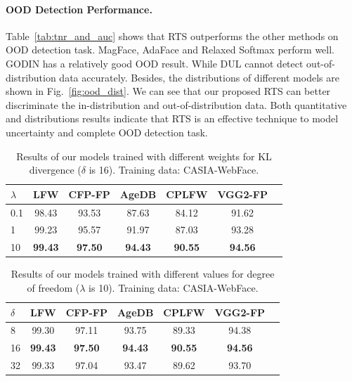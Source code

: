 \documentclass[letterpaper]{article} %
\begin{document}
\paragraph{OOD Detection Performance.}
Table~\ref{tab:tnr_and_auc} shows that RTS outperforms the other methods on OOD detection task. MagFace, AdaFace and Relaxed Softmax perform well. GODIN has a relatively good OOD result. While DUL cannot detect out-of-distribution data accurately. Besides, the distributions of different models are shown in Fig.~\ref{fig:ood_dist}. We can see that our proposed RTS can better discriminate the in-distribution and out-of-distribution data. Both quantitative and distributions results indicate that RTS is an effective technique to model uncertainty and complete OOD detection task.












\begin{table}
\centering
\begin{tabular}{|l|c|c|c|c|c|c|}
\hline
$\lambda$ & LFW & CFP-FP & AgeDB & CPLFW & VGG2-FP \\
\hline\hline
0.1 & 98.43 & 93.53 & 87.63 & 84.12 & 91.62 \\
1 & 99.23 & 95.57 & 91.97 & 87.03 & 93.28 \\
10 & \textbf{99.43} & \textbf{97.50} & \textbf{94.43} & \textbf{90.55} & \textbf{94.56} \\
\hline
\end{tabular}
\caption{Results of our models trained with different weights for KL divergence ($\delta$ is 16). Training data: CASIA-WebFace.}
\label{tab:kl_weight}
\end{table}


\begin{table}
\begin{center}
\begin{tabular}{|l|c|c|c|c|c|c|}
\hline
$\delta$ & LFW & CFP-FP & AgeDB & CPLFW & VGG2-FP \\
\hline\hline
8 & 99.30 & 97.11 & 93.75 & 89.33 & 94.38 \\
16 & \textbf{99.43} & \textbf{97.50} & \textbf{94.43} & \textbf{90.55} & \textbf{94.56} \\
32 & 99.33 & 97.04 & 93.47 & 89.62 & 93.70 \\
\hline
\end{tabular}
\end{center}
\caption{Results of our models trained with different values for degree of freedom ($\lambda$ is 10). Training data: CASIA-WebFace.}
\label{tab:degree_of_freedom}
\end{table}
\end{document}
